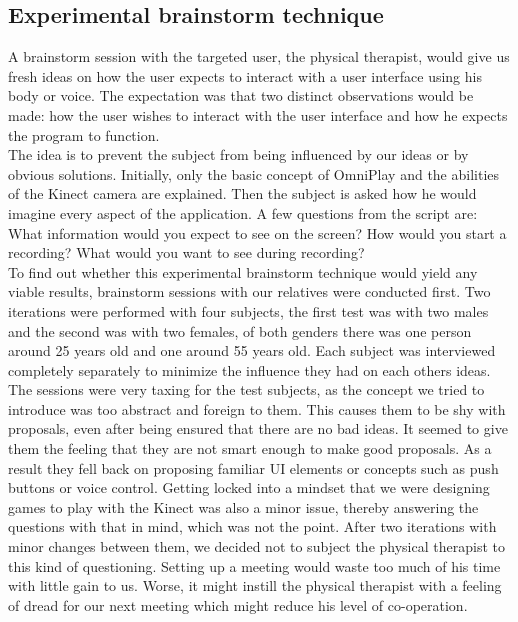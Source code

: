 \subsection{Experimental brainstorm technique}

A brainstorm session with the targeted user, the physical therapist, would give us fresh ideas on how the user expects to interact with a user interface using his body or voice. The expectation was that two distinct observations would be made: how the user wishes to interact with the user interface and how he expects the program to function.\\

The idea is to prevent the subject from being influenced by our ideas or by obvious solutions. Initially, only the basic concept of OmniPlay and the abilities of the Kinect camera are explained. Then the subject is asked how he would imagine every aspect of the application. A few questions from the script are: What information would you expect to see on the screen? How would you start a recording? What would you want to see during recording?\\

To find out whether this experimental brainstorm technique would yield any viable results, brainstorm sessions with our relatives were conducted first. Two iterations were performed with four subjects, the first test was with two males and the second was with two females, of both genders there was one person around 25 years old and one around 55 years old. Each subject was interviewed completely separately to minimize the influence they had on each others ideas.\\

The sessions were very taxing for the test subjects, as the concept we tried to introduce was too abstract and foreign to them. This causes them to be shy with proposals, even after being ensured that there are no bad ideas. It seemed to give them the feeling that they are not smart enough to make good proposals. As a result they fell back on proposing familiar UI elements or concepts such as push buttons or voice control. Getting locked into a mindset that we were designing games to play with the Kinect was also a minor issue, thereby answering the questions with that in mind, which was not the point. After two iterations with minor changes between them, we decided not to subject the physical therapist to this kind of questioning. Setting up a meeting would waste too much of his time with little gain to us. Worse, it might instill the physical therapist with a feeling of dread for our next meeting which might reduce his level of co-operation.\\


